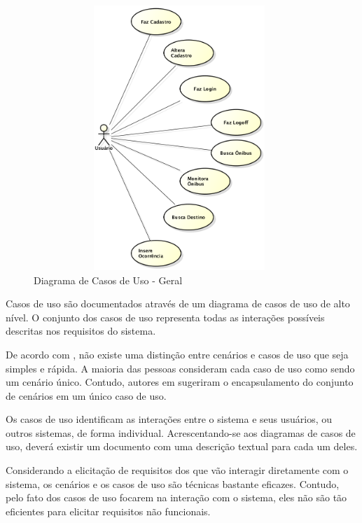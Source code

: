 \begin{figure}[htp]
\begin{center}
  \includegraphics[width=11cm,height=10cm]{images/Diagramas/CasosDeUso_Geral.png}
  \caption{Diagrama de Casos de Uso - Geral}
  \label{fig:diagramaCasosDeUso}
\end{center}
\end{figure}

Casos de uso s\~{a}o documentados atrav\'{e}s de um diagrama de casos de uso de alto n\'{i}vel. O conjunto dos casos de uso representa todas as intera\c{c}\~{o}es poss\'{i}veis descritas nos requisitos do sistema.

De acordo com \cite{SOMMERVILLE2011}, n\~{a}o existe uma distin\c{c}\~{a}o entre cen\'{a}rios e casos de uso que seja simples e r\'{a}pida. A maioria das pessoas consideram cada caso de uso como sendo um cen\'{a}rio \'{u}nico. Contudo, autores em \cite{stevens06} sugeriram o encapsulamento do conjunto de cen\'{a}rios em um \'{u}nico caso de uso.

Os casos de uso identificam as intera\c{c}\~{o}es entre o sistema e seus usu\'{a}rios, ou outros sistemas, de forma individual. Acrescentando-se aos diagramas de casos de uso, dever\'{a} existir um documento com uma descri\c{c}\~{a}o textual para cada um deles.\newline

Considerando a elicita\c{c}\~{a}o de requisitos dos que v\~{a}o interagir diretamente com o sistema, os cen\'{a}rios e os casos de uso s\~{a}o t\'{e}cnicas bastante eficazes. Contudo, pelo fato dos casos de uso focarem na intera\c{c}\~{a}o com o sistema, eles n\~{a}o s\~{a}o t\~{a}o eficientes para elicitar requisitos n\~{a}o funcionais.

